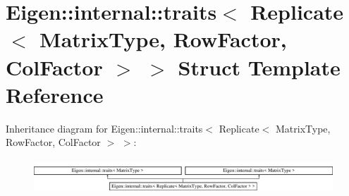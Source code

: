 \hypertarget{struct_eigen_1_1internal_1_1traits_3_01_replicate_3_01_matrix_type_00_01_row_factor_00_01_col_factor_01_4_01_4}{}\section{Eigen\+:\+:internal\+:\+:traits$<$ Replicate$<$ Matrix\+Type, Row\+Factor, Col\+Factor $>$ $>$ Struct Template Reference}
\label{struct_eigen_1_1internal_1_1traits_3_01_replicate_3_01_matrix_type_00_01_row_factor_00_01_col_factor_01_4_01_4}
Inheritance diagram for Eigen\+:\+:internal\+:\+:traits$<$ Replicate$<$ Matrix\+Type, Row\+Factor, Col\+Factor $>$ $>$\+:\begin{figure}[H]
\begin{center}
\leavevmode
\includegraphics[height=1.299304cm]{struct_eigen_1_1internal_1_1traits_3_01_replicate_3_01_matrix_type_00_01_row_factor_00_01_col_factor_01_4_01_4}
\end{center}
\end{figure}
